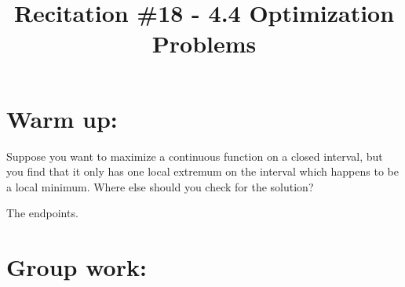 \documentclass[handout,nooutcomes]{ximera}
\title{Recitation \#18 - 4.4 Optimization Problems}
\begin{document}
\begin{abstract}		\end{abstract}
\maketitle

\section*{Warm up:} 
Suppose you want to maximize a continuous function on a closed interval, but you find that it only has one local extremum on the interval which happens to be a local minimum.  Where else should you check for the solution?  
		\begin{freeResponse}
		The endpoints.
		\end{freeResponse}	
		
		
		

	
	
	
	
	

\section*{Group work:}
\end{document}

